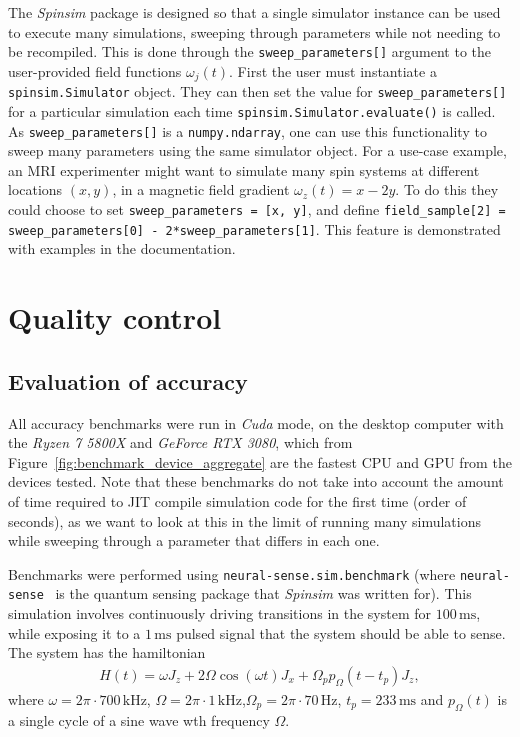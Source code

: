 \documentclass{jors}
\begin{document}
		The \emph{Spinsim} package is designed so that a single simulator instance can be used to execute many simulations, sweeping through parameters while not needing to be recompiled.
		This is done through the \texttt{sweep\_parameters[]} argument to the user-provided field functions $ \omega_j(t) $.
		First the user must instantiate a \texttt{spinsim.Simulator} object.
		They can then set the value for \texttt{sweep\_parameters[]} for a particular simulation each time \texttt{spinsim.Simulator.evaluate()} is called.
		As \texttt{sweep\_parameters[]} is a \texttt{numpy.ndarray}\cite{harris_array_2020}, one can use this functionality to sweep many parameters using the same simulator object.
		For a use-case example, an MRI experimenter might want to simulate many spin systems at different locations $ (x, y) $, in a magnetic field gradient $ \omega_z(t) = x - 2 y $.
		To do this they could choose to set \texttt{sweep\_parameters = [x, y]}, and define \texttt{field\_sample[2] = sweep\_parameters[0] - 2*sweep\_parameters[1]}.%
		This feature is demonstrated with examples in the documentation.

\section{Quality control}
	\subsection{Evaluation of accuracy}\label{sec:accuracy}
		All accuracy benchmarks were run in \emph{Cuda} mode, on the desktop computer with the \emph{Ryzen 7 5800X} and \emph{GeForce RTX 3080}, which from Figure~\ref{fig:benchmark_device_aggregate} are the fastest CPU and GPU from the devices tested.
		Note that these benchmarks do not take into account the amount of time required to JIT compile simulation code for the first time (order of seconds), as we want to look at this in the limit of running many simulations while sweeping through a parameter that differs in each one.
		
		Benchmarks were performed using \texttt{neural-sense.sim.benchmark} (where \texttt{neural-sense}~\cite{alexander-tritt-monash_alexander-tritt-monashneural-sense_2020} is the quantum sensing package that \emph{Spinsim} was written for).
		This simulation involves continuously driving transitions in the system for $ 100\,\mathrm{ms} $, while exposing it to a $ 1\,\mathrm{ms} $ pulsed signal that the system should be able to sense.
		The system has the hamiltonian
		\begin{align}
			H(t) = \omega J_z + 2\Omega\cos(\omega t)J_x + \Omega_p p_\Omega(t - t_p) J_z,\label{eq:neural_pulse}
		\end{align}
		where $ \omega = 2\pi\cdot700\,\mathrm{kHz} $, $ \Omega = 2\pi\cdot1\,\mathrm{kHz} $,$ \Omega_p = 2\pi\cdot70\,\mathrm{Hz} $, $ t_p = 233\,\mathrm{ms} $ and $ p_\Omega(t) $ is a single cycle of a sine wave wth frequency $ \Omega $.
\end{document}
